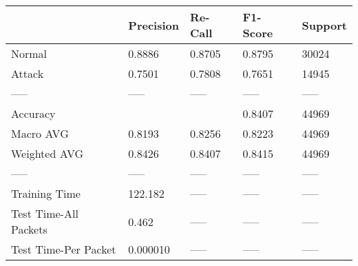 \begin{tabular}{lllll}
\toprule
{} & Precision & Re-Call & F1-Score & Support \\
\midrule
Normal                &    0.8886 &  0.8705 &   0.8795 &   30024 \\
Attack                &    0.7501 &  0.7808 &   0.7651 &   14945 \\
-----                 &     ----- &   ----- &    ----- &   ----- \\
Accuracy              &           &         &   0.8407 &   44969 \\
Macro AVG             &    0.8193 &  0.8256 &   0.8223 &   44969 \\
Weighted AVG          &    0.8426 &  0.8407 &   0.8415 &   44969 \\
-----                 &     ----- &   ----- &    ----- &   ----- \\
Training Time         &   122.182 &   ----- &    ----- &   ----- \\
Test Time-All Packets &     0.462 &   ----- &    ----- &   ----- \\
Test Time-Per Packet  &  0.000010 &   ----- &    ----- &   ----- \\
\bottomrule
\end{tabular}
